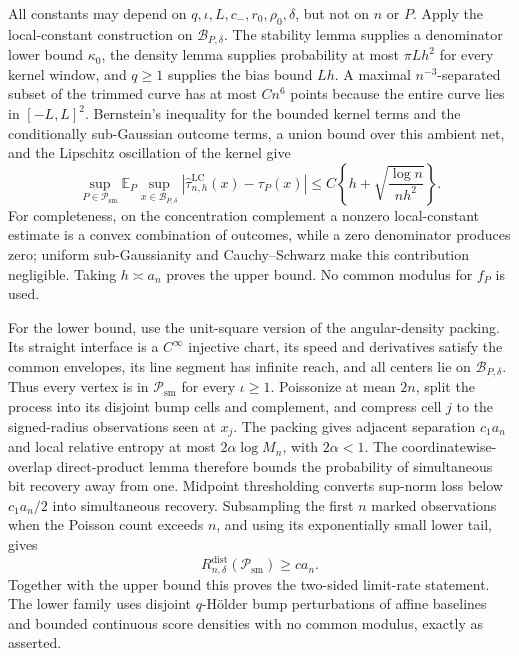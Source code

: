 All constants may depend on \(q,\iota,L,c_-,r_0,\rho_0,\delta\), but not on \(n\) or \(P\).  Apply the local-constant construction on \(\mathcal B_{P,\delta}\).  The stability lemma supplies a denominator lower bound \(\kappa_0\), the density lemma supplies probability at most \(\pi Lh^2\) for every kernel window, and \(q\geq1\) supplies the bias bound \(Lh\).  A maximal \(n^{-3}\)-separated subset of the trimmed curve has at most \(Cn^6\) points because the entire curve lies in \([-L,L]^2\).  Bernstein's inequality for the bounded kernel terms and the conditionally sub-Gaussian outcome terms, a union bound over this ambient net, and the Lipschitz oscillation of the kernel give
\[
\sup_{P\in\mathcal P_{\mathrm{sm}}}
\mathbb E_P\sup_{x\in\mathcal B_{P,\delta}}
|\widehat\tau^{\mathrm{LC}}_{n,h}(x)-\tau_P(x)|
\leq C\left\{h+\sqrt{\frac{\log n}{nh^2}}\right\}.
\]
For completeness, on the concentration complement a nonzero local-constant estimate is a convex combination of outcomes, while a zero denominator produces zero; uniform sub-Gaussianity and Cauchy--Schwarz make this contribution negligible.  Taking \(h\asymp a_n\) proves the upper bound.  No common modulus for \(f_P\) is used.

For the lower bound, use the unit-square version of the angular-density packing.  Its straight interface is a \(C^\infty\) injective chart, its speed and derivatives satisfy the common envelopes, its line segment has infinite reach, and all centers lie on \(\mathcal B_{P,\delta}\).  Thus every vertex is in \(\mathcal P_{\mathrm{sm}}\) for every \(\iota\geq1\).  Poissonize at mean \(2n\), split the process into its disjoint bump cells and complement, and compress cell \(j\) to the signed-radius observations seen at \(x_j\).  The packing gives adjacent separation \(c_1a_n\) and local relative entropy at most \(2\alpha\log M_n\), with \(2\alpha<1\).  The coordinatewise-overlap direct-product lemma therefore bounds the probability of simultaneous bit recovery away from one.  Midpoint thresholding converts sup-norm loss below \(c_1a_n/2\) into simultaneous recovery.  Subsampling the first \(n\) marked observations when the Poisson count exceeds \(n\), and using its exponentially small lower tail, gives
\[
R_{n,\delta}^{\mathrm{dist}}(\mathcal P_{\mathrm{sm}})\geq ca_n.
\]
Together with the upper bound this proves the two-sided limit-rate statement.  The lower family uses disjoint \(q\)-H\"older bump perturbations of affine baselines and bounded continuous score densities with no common modulus, exactly as asserted.